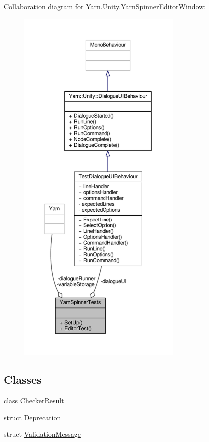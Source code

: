 Collaboration diagram for Yarn.\-Unity.\-Yarn\-Spinner\-Editor\-Window\-:
\nopagebreak
\begin{figure}[H]
\begin{center}
\leavevmode
\includegraphics[width=224pt]{d2/d45/a00342}
\end{center}
\end{figure}
\subsection*{Classes}
\begin{DoxyCompactItemize}
\item 
class \hyperlink{a00024}{Checker\-Result}
\item 
struct \hyperlink{a00034}{Deprecation}
\item 
struct \hyperlink{a00085_d9/d38/a00166}{Validation\-Message}
\end{DoxyCompactItemize}

